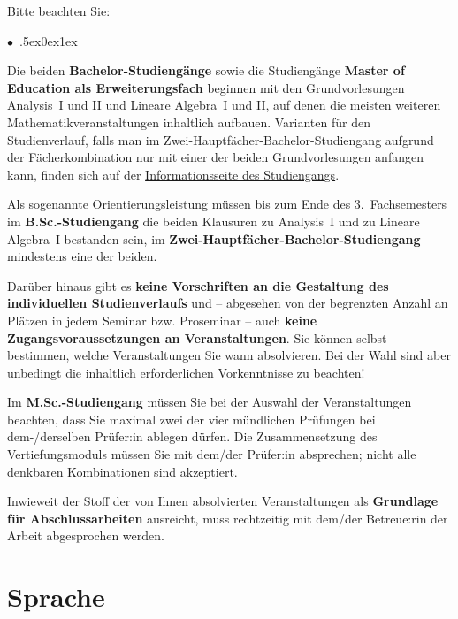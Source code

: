 \documentclass[a4paper,10pt]{article}
\renewenvironment{itemize}{\begin{list}{$\bullet$\ }{\itemsep.5ex\setlength{\topsep}{0.5\itemsep}\parsep0ex\labelsep1ex\settowidth{\labelwidth}{$\bullet$\ }\setlength{\leftmargin}{\labelwidth}\addtolength{\leftmargin}{3ex}\addtolength{\leftmargin}{\labelsep}}}{\end{list}}
\begin{document}
\medskip
Bitte beachten Sie:
\begin{itemize}
\item 
  Die beiden \textbf{Bachelor-Studiengänge} sowie die Studiengänge \textbf{Master of Education als Erweiterungsfach}
  beginnen mit den Grundvorlesungen Analysis~I und II und Lineare Algebra~I und II, auf denen die meisten
  weiteren Mathematikveranstaltungen inhaltlich aufbauen. Varianten für den Studienverlauf,
  falls man im Zwei-Hauptfächer-Bachelor-Studiengang aufgrund der Fächerkombination nur mit einer der
  beiden Grundvorlesungen anfangen kann, finden sich auf der
  \href{https://www.math.uni-freiburg.de/nlehre/de/studiengaenge/2hfb/}{Informationsseite des Studiengangs}.
\item
  Als sogenannte Orientierungsleistung müssen bis zum Ende des 3.~Fachsemesters im \textbf{B.Sc.-Studiengang}
  die beiden Klausuren zu Analysis~I und zu Lineare Algebra~I bestanden sein,
  im \textbf{Zwei-Hauptfächer-Bachelor-Studiengang} mindestens eine der beiden.
\item
  Darüber hinaus gibt es \textbf{keine Vorschriften an die Gestaltung des individuellen Studienverlaufs}
  und -- abgesehen von der begrenzten Anzahl an Plätzen in jedem Seminar bzw. Proseminar --
  auch \textbf{keine Zugangsvoraussetzungen an Veranstaltungen}.
  Sie können selbst bestimmen, welche Veranstaltungen Sie wann absolvieren.
  Bei der Wahl sind aber unbedingt die inhaltlich erforderlichen Vorkenntnisse zu beachten!
\item
  Im \textbf{M.Sc.-Studiengang} müssen Sie bei der Auswahl der Veranstaltungen beachten,
  dass Sie maximal zwei der vier mündlichen Prüfungen bei dem-/derselben Prüfer:in ablegen dürfen.
  Die Zusammensetzung des Vertiefungsmoduls müssen Sie mit dem/der Prüfer:in absprechen;
  nicht alle denkbaren Kombinationen sind akzeptiert.
\item
  Inwieweit der Stoff der von Ihnen absolvierten Veranstaltungen als \textbf{Grundlage für Abschlussarbeiten}
  ausreicht, muss rechtzeitig mit dem/der Betreue:rin der Arbeit abgesprochen werden.
\end{itemize}



\section*{Sprache} 
\end{document}
